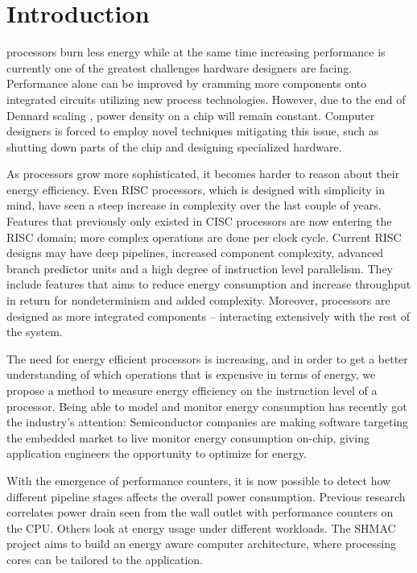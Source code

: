 \section{Introduction}

 processors burn less energy while at the same time
increasing performance is currently one of the greatest challenges hardware
designers are facing. Performance alone can be improved by cramming more
components onto integrated circuits \cite{moore1965cramming} utilizing new
process technologies. However, due to the end of Dennard scaling \cite{dennard},
power density on a chip will remain constant. Computer designers is forced to
employ novel techniques mitigating this issue, such as shutting down parts of
the chip \cite{esmaeilzadeh2011dark} and designing specialized hardware.

As processors grow more sophisticated, it becomes harder to reason about their
energy efficiency. Even RISC processors, which is designed with simplicity in
mind\cite{sivarama}, have seen a steep increase in complexity over the last
couple of years\cite{alf_egil_bogen_cisc_risc_blog}. Features that previously
only existed in CISC processors are now entering the RISC domain; more complex
operations are done per clock cycle. Current RISC designs may have deep
pipelines, increased component complexity, advanced branch predictor units and a
high degree of instruction level parallelism. They include features that aims to
reduce energy consumption and increase throughput in return for nondeterminism
and added complexity.  Moreover, processors are designed as more integrated
components -- interacting extensively with the rest of the system.

The need for energy efficient processors is increasing, and in order to get a
better understanding of which operations that is expensive in terms of energy,
we propose a method to measure energy efficiency on the instruction level of a
processor. Being able to model and monitor energy consumption has recently
got the industry's attention: Semiconductor companies are making software
targeting the embedded market to live monitor energy consumption on-chip, giving
application engineers the opportunity to optimize for energy.

With the emergence of performance counters, it is now possible to detect how
different pipeline stages affects the overall power consumption. Previous
research correlates power drain seen from the wall outlet with performance
counters on the CPU\cite{singh}\cite{bertran}\cite{bircher}. Others look at
energy usage under different workloads\cite{carroll2010analysis}. The SHMAC
project\cite{Umuroglu662354}\cite{rusten2012implementing} aims to build an
energy aware computer architecture, where processing cores can be tailored to
the application.

